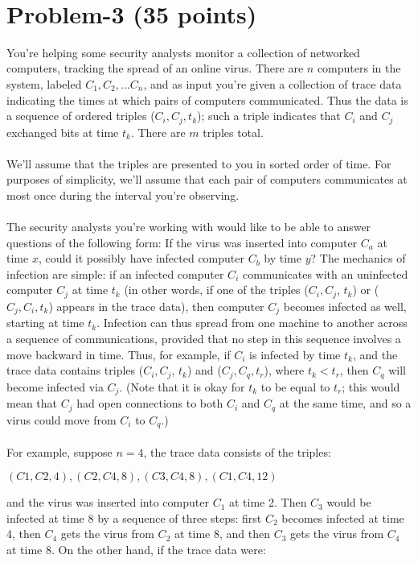 \documentclass[11pt]{article}
\begin{document}
​
\newpage
\section*{Problem-3 (35 points)}
\noindent
You're helping some security analysts monitor a collection of networked
computers, tracking the spread of an online virus. There are $n$ computers in the system, labeled $C_1, C_2, ... C_n$, and as input you're given a collection of trace data indicating the times at which pairs of computers communicated. Thus the data is a sequence of ordered triples ($C_i, C_j, t_k$); such a triple indicates that $C_i$ and $C_j$ exchanged bits at time $t_k$. There are $m$ triples total.  \\ \\ \noindent
We'll assume that the triples are presented to you in sorted order of time. For purposes of simplicity, we'll assume that each pair of computers communicates at most once during the interval you're observing. \\ \\ \noindent
The security analysts you're working with would like to be able to answer questions of the following form: If the virus was inserted into computer $C_a$ at time $x$, could it possibly have infected computer $C_b$ by time $y$? The mechanics of infection are simple: if an infected computer $C_i$ communicates with an uninfected computer $C_j$ at time $t_k$ (in other words, if one of the triples ($C_i, C_j$, $t_k$) or ($C_j,C_i, t_k$) appears in the trace data), then computer $C_j$ becomes infected as well, starting at time $t_k$. Infection can thus spread from one machine to another across a sequence of communications, provided that no step in this sequence involves a move backward in time. Thus, for example, if $C_i$ is infected by time $t_k$, and the trace data contains triples ($C_i, C_j$, $t_k$) and ($C_j,C_q, t_r$), where $t_k < t_r$, then $C_q$ will become infected via $C_j$. (Note that it is okay for $t_k$ to be equal to $t_r$; this would mean that $C_j$ had open connections to both $C_i$ and $C_q$ at the same time, and so a virus could move from $C_i$ to $C_q$.)  \\ \\ \noindent
For example, suppose $n= 4$, the trace data consists of the triples:
\begin{center}
$(C1, C2,4), (C2,C4,8), (C3,C4,8), (C1,C4, 12)$

\end{center}
and the virus was inserted into computer $C_1$ at time 2. Then $C_3$ would be infected at time 8 by a sequence of three steps: first $C_2$ becomes infected at time 4, then $C_4$ gets the virus from $C_2$ at time 8, and then $C_3$ gets the virus from $C_4$ at time 8. On the other hand, if the trace data were:
\end{document}
